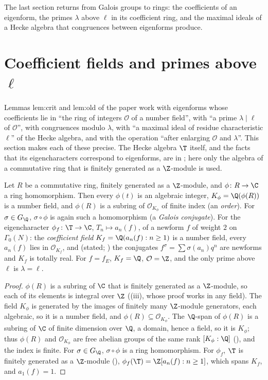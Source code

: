 The last section returns from Galois groups to rings: the coefficients of an eigenform, the primes $\lambda$ above $\ell$ in its coefficient ring, and the
maximal ideals of a Hecke algebra that congruences between eigenforms produce.

\section{Coefficient fields and primes above \texorpdfstring{$\ell$}{l}}\label{sec:ant:coefficients}

Lemmas lem:crit and lem:old of the paper work with eigenforms whose coefficients lie in ``the ring of integers $\mathcal O$ of a number field'', with ``a prime
$\lambda\mid\ell$ of $\mathcal O$'', with congruences modulo $\lambda$, with ``a maximal ideal of residue characteristic $\ell$'' of the Hecke algebra, and with the
operation ``after enlarging $\mathcal O$ and $\lambda$''. This section makes each of these precise. The Hecke algebra $\T$ itself, and the facts that its
eigencharacters correspond to eigenforms, are in ; here only the algebra of a commutative ring that is finitely generated as a
$\Z$-module is used.

\begin{proposition}\label{prop:ant:coefffield}
Let $R$ be a commutative ring, finitely generated as a $\Z$-module, and $\phi\colon R\to\C$ a ring homomorphism. Then every $\phi(t)$ is an algebraic integer,
$K_\phi=\Q(\phi(R))$ is a number field, and $\phi(R)$ is a subring of $\mathcal O_{K_\phi}$ of finite index (an \emph{order}). For
$\sigma\in G_\Q$, $\sigma\circ\phi$ is again such a homomorphism (a \emph{Galois conjugate}). For the eigencharacter $\phi_f\colon\T\to\C$, $T_n\mapsto a_n(f)$, of a
newform $f$ of weight $2$ on $\Gamma_0(N)$: the \emph{coefficient field} $K_f=\Q(a_n(f):n\ge1)$ is a number field, every $a_n(f)$ lies in $\mathcal O_{K_f}$, and
(stated; ) the conjugates $f^\sigma=\sum\sigma(a_n)q^n$ are newforms and $K_f$ is totally real. For $f=f_E$, $K_f=\Q$, $\mathcal O=\Z$, and the only
prime above $\ell$ is $\lambda=\ell$.
\end{proposition}

\begin{proof}
$\phi(R)$ is a subring of $\C$ that is finitely generated as a $\Z$-module, so each of its elements is integral over $\Z$ ((iii),
whose proof works in any field). The field $K_\phi$ is generated by the images of finitely many $\Z$-module generators, each algebraic, so it is a number
field, and $\phi(R)\subseteq\mathcal O_{K_\phi}$. The $\Q$-span of $\phi(R)$ is a subring of $\C$ of finite dimension over $\Q$, a domain, hence a field, so it is $K_\phi$; thus
$\phi(R)$ and $\mathcal O_{K_\phi}$ are free abelian groups of the same rank $[K_\phi:\Q]$ (), and the index is finite. For $\sigma\in G_\Q$, $\sigma\circ\phi$ is a ring homomorphism. For $\phi_f$, $\T$ is finitely generated as a $\Z$-module
(), $\phi_f(\T)=\Z[a_n(f):n\ge1]$, which spans $K_f$, and $a_1(f)=1$.
\end{proof}

